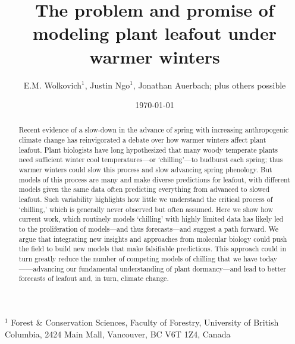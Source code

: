 \documentclass[11pt]{article}
\begin{document}
\renewcommand{\refname}{\CHead{}}


\title{The problem and promise of \\ modeling plant leafout under warmer winters} %
\author{E.M. Wolkovich$^1$, Justin Ngo$^1$, Jonathan Auerbach; plus others possible} %
\date{\today}
\maketitle

$^1$ Forest \& Conservation Sciences, Faculty of Forestry, University of British Columbia, 2424 Main Mall, Vancouver, BC V6T 1Z4, Canada\\


\begin{abstract}
Recent evidence of a slow-down in the advance of spring with increasing anthropogenic climate change has reinvigorated a debate over how warmer winters affect plant leafout. Plant biologists have long hypothesized that many woody temperate plants need sufficient winter cool temperatures---or `chilling'---to budburst each spring; thus warmer winters could slow this process and slow advancing spring phenology. But models of this process are many and make diverse predictions for leafout, with different models given the same data often predicting everything from advanced to slowed leafout. Such variability highlights how little we understand the critical process of `chilling,' which is generally never observed but often assumed. Here we show how current work, which routinely models `chilling' with highly limited data has likely led to the proliferation of models---and thus forecasts---and suggest a path forward. We argue that integrating new insights and approaches from molecular biology could push the field to build new models that make falsifiable predictions. This approach could in turn greatly reduce the number of competing models of chilling that we have today------advancing our fundamental understanding of plant dormancy---and lead to better forecasts of leafout and, in turn, climate change. 
\end{abstract}
\end{document}
